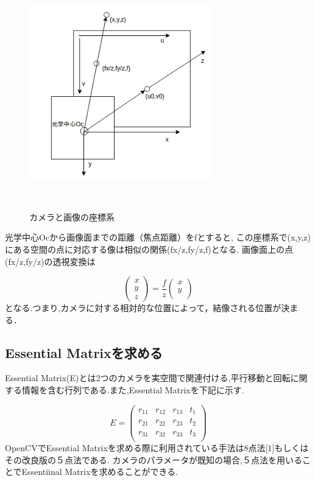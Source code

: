 \documentclass[a4paper]{jarticle}
\begin{document}
\begin{figure}[b]
 \begin{center}
  \includegraphics[width=80mm]{image/camera2.png}
 　\caption{カメラと画像の座標系}%
 　\label{fig:04}%
 \end{center}
\end{figure}

光学中心Ocから画像面までの距離（焦点距離）をfとすると,
この座標系で(x,y,z)にある空間の点に対応する像は相似の関係(fx/z,fy/z,f)となる.
画像面上の点(fx/z,fy/z)の透視変換は

\begin{equation}
\left(
    \begin{array}{c}
      x \\
      y \\
      z 
    \end{array}
  \right)=\frac{f}{z} \left(
    \begin{array}{c}
      x \\
      y \\
       
    \end{array}
  \right)
\end{equation}
となる.つまり,カメラに対する相対的な位置によって，結像される位置が決まる．

\subsection{Essential Matrixを求める}
Essential Matrix(E)とは2つのカメラを実空間で関連付ける,平行移動と回転に関する情報を含む行列である.また,Essential Matrixを下記に示す.

\begin{equation}
       E = \left(
    \begin{array}{cccc}
      r _{11} & r _{12} & r _{13} & t_1\\
      r _{21} & r _{22} & r _{23} & t_2\\
      r _{31} & r _{32} & r _{33} & t_3\\

    \end{array}
  \right)
\end{equation}
OpenCVでEssential Matrixを求める際に利用されている手法は8点法{\scriptsize[1]}もしくはその改良版の５点法である.
カメラのパラメータが既知の場合,５点法を用いることでEssentiinal Matrixを求めることができる.
\end{document}

